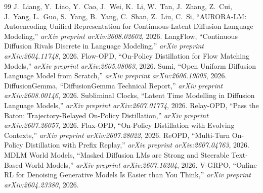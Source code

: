 \documentclass[11pt,a4paper]{article}
\begin{document}
\begin{thebibliography}{99}
 J.~Liang, Y.~Liao, Y.~Cao, J.~Wei, K.~Li, W.~Tan, J.~Zhang, Z.~Cui, J.~Yang, L.~Guo, S.~Yang, B.~Yang, C.~Shan, Z.~Liu, C.~Si, ``AURORA-LM: Autoencoding Unified Representation for Continuous-Latent Diffusion Language Modeling,'' \emph{arXiv preprint arXiv:2608.02602}, 2026.
 LangFlow, ``Continuous Diffusion Rivals Discrete in Language Modeling,'' \emph{arXiv preprint arXiv:2604.11748}, 2026.
 Flow-OPD, ``On-Policy Distillation for Flow Matching Models,'' \emph{arXiv preprint arXiv:2605.08063}, 2026.
 Sumi, ``Open Uniform Diffusion Language Model from Scratch,'' \emph{arXiv preprint arXiv:2606.19005}, 2026.
 DiffusionGemma, ``DiffusionGemma Technical Report,'' \emph{arXiv preprint arXiv:2608.00146}, 2026.
 Subliminal Clocks, ``Latent Time Modelling in Diffusion Language Models,'' \emph{arXiv preprint arXiv:2607.01774}, 2026.
 Relay-OPD, ``Pass the Baton: Trajectory-Relayed On-Policy Distillation,'' \emph{arXiv preprint arXiv:2607.26057}, 2026.
 Flux-OPD, ``On-Policy Distillation with Evolving Contexts,'' \emph{arXiv preprint arXiv:2607.28022}, 2026.
 ReOPD, ``Multi-Turn On-Policy Distillation with Prefix Replay,'' \emph{arXiv preprint arXiv:2607.04763}, 2026.
 MDLM World Models, ``Masked Diffusion LMs are Strong and Steerable Text-Based World Models,'' \emph{arXiv preprint arXiv:2607.16204}, 2026.
 V-GRPO, ``Online RL for Denoising Generative Models Is Easier than You Think,'' \emph{arXiv preprint arXiv:2604.23380}, 2026.
\end{thebibliography}
\end{document}
